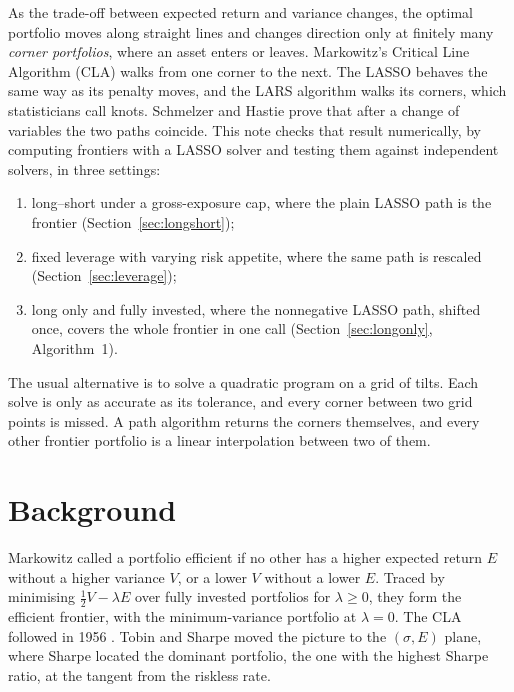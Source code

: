 \documentclass[11pt]{article}
\begin{document}
As the trade-off between expected return and variance changes, the optimal portfolio moves
along straight lines and changes direction only at finitely many \emph{corner
portfolios}, where an asset enters or leaves. Markowitz's Critical Line Algorithm (CLA)
\cite{markowitz1956} walks from one corner to the next. The LASSO \cite{tibshirani1996}
behaves the same way as its penalty moves, and the LARS algorithm \cite{efron2004} walks
its corners, which statisticians call knots. Schmelzer and Hastie \cite{perspective}
prove that after a change of variables the two paths coincide. This note checks that
result numerically, by computing frontiers with a LASSO solver and testing them against
independent solvers, in three settings:
\begin{enumerate}\setlength{\itemsep}{0pt}
\item long--short under a gross-exposure cap, where the plain LASSO path is the frontier
(Section~\ref{sec:longshort});
\item fixed leverage with varying risk appetite, where the same path is rescaled
(Section~\ref{sec:leverage});
\item long only and fully invested, where the nonnegative LASSO path, shifted once,
covers the whole frontier in one call (Section~\ref{sec:longonly}, Algorithm~1).
\end{enumerate}
The usual alternative is to solve a quadratic program on a grid of tilts. Each solve is
only as accurate as its tolerance, and every corner between two grid points is missed.
A path algorithm returns the corners themselves, and every other frontier portfolio is a
linear interpolation between two of them.

\section{Background}
\label{sec:history}

Markowitz \cite{markowitz1952} called a portfolio efficient if no other has a higher
expected return $E$ without a higher variance $V$, or a lower $V$ without a lower $E$. Traced by minimising
$\tfrac12V-\lambda E$ over fully invested portfolios for $\lambda\ge0$, they form the
efficient frontier, with the minimum-variance portfolio at $\lambda=0$. The CLA followed
in 1956 \cite{markowitz1956}. Tobin \cite{tobin1958} and Sharpe \cite{sharpe1964} moved
the picture to the $(\sigma,E)$ plane, where Sharpe located the dominant portfolio, the
one with the highest Sharpe ratio, at the tangent from the riskless rate.
\end{document}
